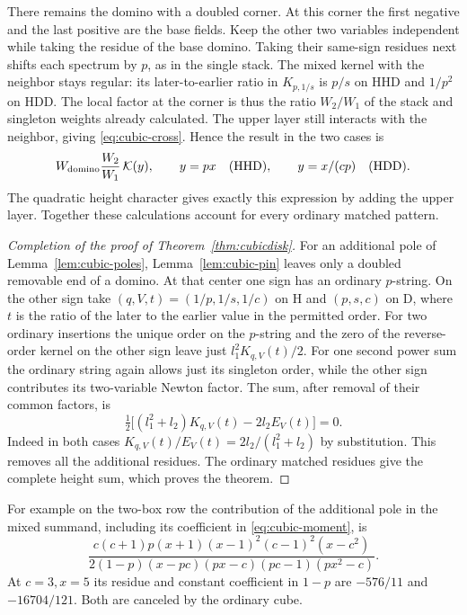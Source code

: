 There remains the domino with a doubled corner. At this corner
the first negative and the last positive are the base fields. Keep
the other two variables independent while taking the residue of the
base domino. Taking their same-sign residues next shifts each
spectrum by $p$, as in the single stack. The mixed kernel with
the neighbor stays regular: its later-to-earlier ratio in
$K_{p,1/s}$ is $p/s$ on HHD and $1/p^2$ on HDD. The local
factor at the corner is thus the ratio $W_2/W_1$ of the stack
and singleton weights already calculated. The upper layer still
interacts with the neighbor, giving \eqref{eq:cubic-cross}. Hence
the result in the two cases is
\[
 W_{\rm domino}\frac{W_2}{W_1}\,\mathcal K(y),\qquad
 y=px\quad({\rm HHD}),\qquad y=x/(cp)\quad({\rm HDD}).
\]
The quadratic height character gives exactly this expression by
adding the upper layer. Together these calculations account for
every ordinary matched pattern.

\begin{proof}[Completion of the proof of Theorem~\ref{thm:cubicdisk}]
For an additional pole of Lemma~\ref{lem:cubic-poles},
Lemma~\ref{lem:cubic-pin} leaves only a doubled removable end of a
domino. At that center one sign has an ordinary $p$-string. On the
other sign take $(q,V,t)=(1/p,1/s,1/c)$ on H and $(p,s,c)$ on D,
where $t$ is the ratio of the later to the earlier value in the
permitted order. For two ordinary insertions the unique order on
the $p$-string and the zero of the reverse-order kernel on the other
sign leave just $l_1^2 K_{q,V}(t)/2$. For one second power sum the
ordinary string again allows just its singleton order, while the
other sign contributes its two-variable Newton factor. The sum,
after removal of their common factors, is
\[
 \tfrac12\big[(l_1^2+l_2)K_{q,V}(t)-2l_2 E_V(t)\big]=0 .
\]
Indeed in both cases $K_{q,V}(t)/E_V(t)=
2l_2/(l_1^2+l_2)$ by substitution. This removes all the additional
residues. The ordinary matched residues give the complete height sum,
which proves the theorem.
\end{proof}

For example on the two-box row the contribution of the additional
pole in the mixed summand, including its coefficient in
\eqref{eq:cubic-moment}, is
\[
 \frac{c(c+1)p(x+1)(x-1)^2(c-1)^2(x-c^2)}
 {2(1-p)(x-pc)(px-c)(pc-1)(px^2-c)} .
\]
At $c=3,x=5$ its residue and constant coefficient in $1-p$ are
$-576/11$ and $-16704/121$. Both are canceled by the ordinary cube.

